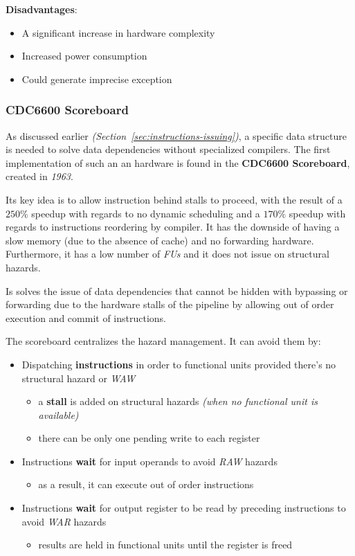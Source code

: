\documentclass[english]{article}
\begin{document}
\textbf{Disadvantages}:
\begin{itemize}
  \item A significant increase in hardware complexity
  \item Increased power consumption
  \item Could generate imprecise exception
\end{itemize}

\subsubsection{CDC6600 Scoreboard}
\label{par:CDC6600-scoreboard}

As discussed earlier \textit{(Section~\ref{sec:instructions-issuing})}, a specific data structure is needed to solve data dependencies without specialized compilers.
The first implementation of such an an hardware is found in the \textbf{CDC6600 Scoreboard}, created in \textit{1963}.

Its key idea is to allow instruction behind stalls to proceed, with the result of a \(250\%\) speedup with regards to no dynamic scheduling and a \(170\%\) speedup with regards to instructions reordering by compiler.
It has the downside of having a slow memory (due to the absence of cache) and no forwarding hardware.
Furthermore, it has a low number of \textit{FUs} and it does not issue on structural hazards.

Is solves the issue of data dependencies that cannot be hidden with bypassing or forwarding due to the hardware stalls of the pipeline by allowing out of order execution and commit of instructions.

\bigskip
The scoreboard centralizes the hazard management.
It can avoid them by:

\begin{itemize}
  \item Dispatching \textbf{instructions} in order to functional units provided there's no structural hazard or \textit{WAW}
        \begin{itemize}
          \item a \textbf{stall} is added on structural hazards \textit{(when no functional unit is available)}
          \item there can be only one pending write to each register
        \end{itemize}
  \item Instructions \textbf{wait} for input operands to avoid \textit{RAW} hazards
        \begin{itemize}
          \item as a result, it can execute out of order instructions
        \end{itemize}
  \item Instructions \textbf{wait} for output register to be read by preceding instructions to avoid \textit{WAR} hazards
        \begin{itemize}
          \item results are held in functional units until the register is freed
        \end{itemize}
\end{itemize}
\end{document}
